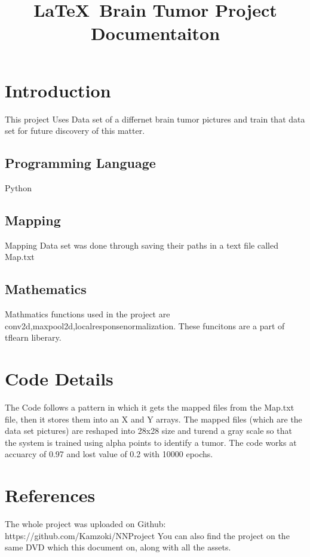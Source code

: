 \documentclass[10pt,twocolumn,letterpaper]{article}
\begin{document}
\title{\LaTeX\ Brain Tumor Project Documentaiton}


\maketitle

\begin{abstract}
\end{abstract}

\section{Introduction}

This project Uses Data set of a differnet brain tumor\linebreak
pictures and train that data set for future discovery of this
matter.

\subsection{Programming Language}

Python

\subsection{Mapping}
Mapping Data set was done through saving their paths in a text file called Map.txt

\subsection{Mathematics}

Mathmatics functions used in the project are conv2d,maxpool2d,localresponsenormalization.\linebreak
These funcitons are a part of tflearn liberary.

\section{Code Details}
The Code follows a pattern in which it gets the mapped files from the Map.txt file, then it stores them into an X and Y arrays. The mapped files (which are the data set pictures) are reshaped
into 28x28 size and turend a gray scale so that the system is trained using alpha points to identify a tumor.
The code works at accuarcy of 0.97 and lost value of 0.2 with 10000 epochs.

\section{References}

The whole project was uploaded on Github: https://github.com/Kamzoki/NNProject
You can also find the project on the same DVD which this document on, along with all the assets.
\end{document}

